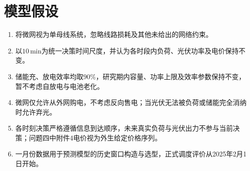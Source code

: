 \section{模型假设}

\begin{enumerate}
  \item 将微网视为单母线系统，忽略线路损耗及其他未给出的网络约束。

  \item 以$10\,\mathrm{min}$为统一决策时间尺度，并认为各时段内负荷、光伏功率及电价保持不变。

  \item 储能充、放电效率均取$90\%$，研究期内容量、功率上限及效率参数保持不变，暂不考虑自放电与电池老化。

  \item 微网仅允许从外网购电，不考虑反向售电；当光伏无法被负荷或储能完全消纳时允许弃光。

  \item 各时刻决策严格遵循信息到达顺序，未来真实负荷与光伏出力不参与当前决策；问题四中附件4电价视为外生给定价格序列。

  \item 一月份数据用于预测模型的历史窗口构造与选型，正式调度评价从2025年2月1日开始。
\end{enumerate}
